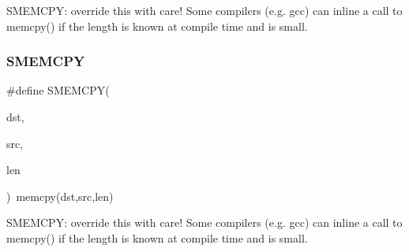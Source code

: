 S\+M\+E\+M\+C\+PY\+: override this with care! Some compilers (e.\+g. gcc) can inline a call to memcpy() if the length is known at compile time and is small. \mbox{\label{group__lwip__opts__memcpy_ga8c6e3c1e4f74acb16376188dbf8909ec}} 
\subsubsection{\texorpdfstring{S\+M\+E\+M\+C\+PY}{SMEMCPY}\hspace{0.1cm}{\footnotesize\ttfamily [2/2]}}
{\footnotesize\ttfamily \#define S\+M\+E\+M\+C\+PY(\begin{DoxyParamCaption}\item[{}]{dst,  }\item[{}]{src,  }\item[{}]{len }\end{DoxyParamCaption})~memcpy(dst,src,len)}

S\+M\+E\+M\+C\+PY\+: override this with care! Some compilers (e.\+g. gcc) can inline a call to memcpy() if the length is known at compile time and is small. 